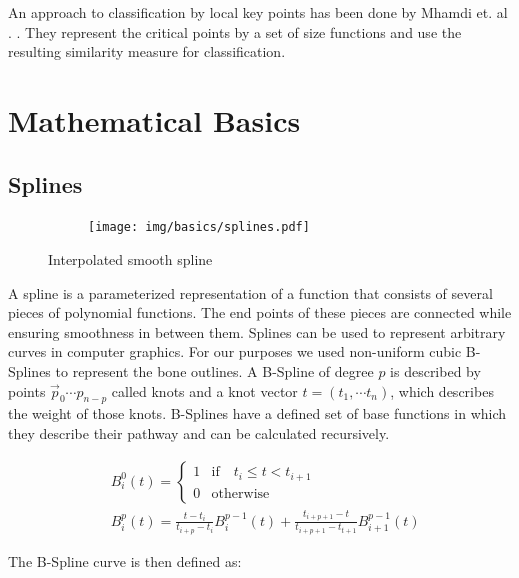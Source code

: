 \documentclass[pdftex,12pt,a4paper]{report}
\begin{document}
An approach to classification by local key points has been done by Mhamdi et. al . \cite{mhamdi2014local}. They represent the critical points by a set of size functions and use the resulting similarity measure for classification.

\chapter{Mathematical Basics}

\section{Splines}
\label{section:splines}

\begin{figure}[h]
	\centering
	\begin{subfigure}[b]{0.3\textwidth}
		\centering
		\texttt{[image: img/basics/splines.pdf]}
	\end{subfigure}
	\caption{Interpolated smooth spline}
	\label{fig:basics-splines}
\end{figure}

A spline is a parameterized representation of a function that consists of several pieces of polynomial functions. The end points of these pieces are connected while ensuring smoothness in between them. Splines can be used to represent arbitrary curves in computer graphics. For our purposes we used non-uniform cubic B-Splines to represent the bone outlines. A B-Spline of degree $p$ is described by points $\vec{p}_0 \cdots p_{n-p}$ called knots and a knot vector $t = (t_1, \cdots t_{n})$, which describes the weight of those knots.  B-Splines have a defined set of base functions in which they describe their pathway and can be calculated recursively.

\begin{equation}
\begin{split}
& B_i^0(t) = \left\{
\begin{matrix} 
1 & \mathrm{if} \quad t_i \leq t < t_{i+1} \\
0 & \mathrm{otherwise} 
\end{matrix} \right. \\
& B_i^p(t) = \frac{t - t_i}{t_{i+p} - t_i} B_i^{p-1}(t) + \frac{t_{i+p+1} - t}{t_{i+p+1} - t_{t+1}} B_{i+1}^{p-1}(t)
\end{split} 
\end{equation}

The B-Spline curve is then defined as:
\end{document}
